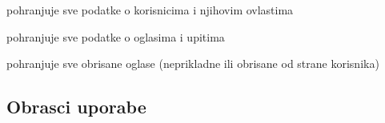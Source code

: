 \begin{packed_enum}
				\begin{packed_enum}
					
					\item pohranjuje sve podatke o korisnicima i njihovim ovlastima
					\item pohranjuje sve podatke o oglasima i upitima
					\item pohranjuje sve obrisane oglase (neprikladne ili obrisane od strane korisnika)
					
				\end{packed_enum}
				
				
			\end{packed_enum}
			
			\eject 
			
			
				
			\subsection{Obrasci uporabe}
				
